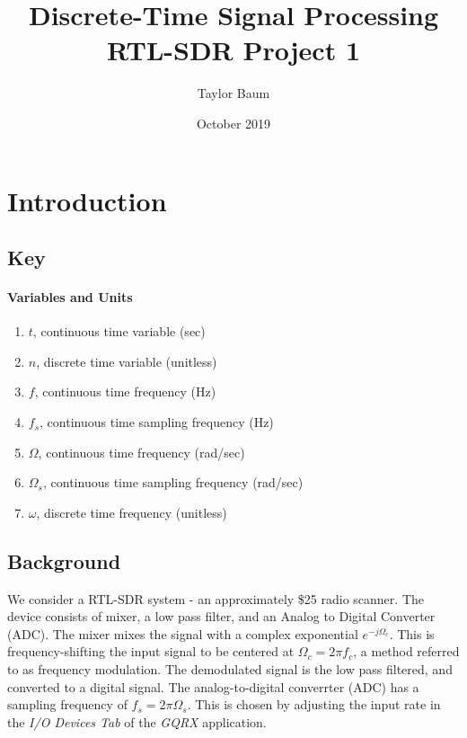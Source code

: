 \documentclass{article}
\title{Discrete-Time Signal Processing RTL-SDR Project 1}
\author{Taylor Baum}
\date{October 2019}
\begin{document}
\maketitle

\section{Introduction}

\subsection{Key}

\paragraph{Variables and Units}

\begin{enumerate}
    \item $t$, continuous time variable (sec)
    \item $n$, discrete time variable (unitless)
    \item $f$, continuous time frequency (Hz)
    \item $f_s$, continuous time sampling frequency (Hz)
    \item $\Omega$, continuous time frequency (rad/sec)
    \item $\Omega_s$, continuous time sampling frequency (rad/sec)
    \item $\omega$, discrete time frequency (unitless)
\end{enumerate}

\subsection{Background}

We consider a RTL-SDR system - an approximately \$25 radio scanner. The device consists of mixer, a low pass filter, and an Analog to Digital Converter (ADC). The mixer mixes the signal with a complex exponential $e^{-j\Omega_c}$. This is frequency-shifting the input signal to be centered at $\Omega_c = 2\pi f_c$, a method referred to as frequency modulation. The demodulated signal is the low pass filtered, and converted to a digital signal. The analog-to-digital converrter (ADC) has a sampling frequency of $f_s = 2\pi\Omega_s$. This is chosen by adjusting the input rate in the \textit{I/O Devices Tab} of the \textit{GQRX} application.
\end{document}
